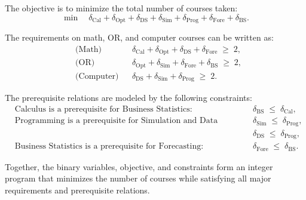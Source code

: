 \documentclass{article}
\begin{document}
\begin{enumerate}
The objective is to minimize the total number of courses taken:
\[
\min \quad \delta_{\mathrm{Cal}} + \delta_{\mathrm{Opt}} + \delta_{\mathrm{DS}} + \delta_{\mathrm{Sim}} + \delta_{\mathrm{Prog}} + \delta_{\mathrm{Fore}} + \delta_{\mathrm{BS}}.
\]

The requirements on math, OR, and computer courses can be written as:
\begin{align*}
    &\text{(Math)} && \delta_{\mathrm{Cal}} + \delta_{\mathrm{Opt}} + \delta_{\mathrm{DS}} + \delta_{\mathrm{Fore}} \;\geq\; 2, \\
    &\text{(OR)}   && \delta_{\mathrm{Opt}} + \delta_{\mathrm{Sim}} + \delta_{\mathrm{Fore}} + \delta_{\mathrm{BS}} \;\geq\; 2, \\
    &\text{(Computer)} && \delta_{\mathrm{DS}} + \delta_{\mathrm{Sim}} + \delta_{\mathrm{Prog}} \;\geq\; 2.
\end{align*}

The prerequisite relations are modeled by the following constraints:
\begin{align*}
    &\text{Calculus is a prerequisite for Business Statistics:} && \delta_{\mathrm{BS}} \;\leq\; \delta_{\mathrm{Cal}}, \\
    &\text{Programming is a prerequisite for Simulation and Data Structures:} && \delta_{\mathrm{Sim}} \;\leq\; \delta_{\mathrm{Prog}}, \\
    &&& \delta_{\mathrm{DS}} \;\leq\; \delta_{\mathrm{Prog}}, \\
    &\text{Business Statistics is a prerequisite for Forecasting:} && \delta_{\mathrm{Fore}} \;\leq\; \delta_{\mathrm{BS}}.
\end{align*}

Together, the binary variables, objective, and constraints form an integer program that minimizes the number of courses while satisfying all major requirements and prerequisite relations.


\end{enumerate}
\end{document}
